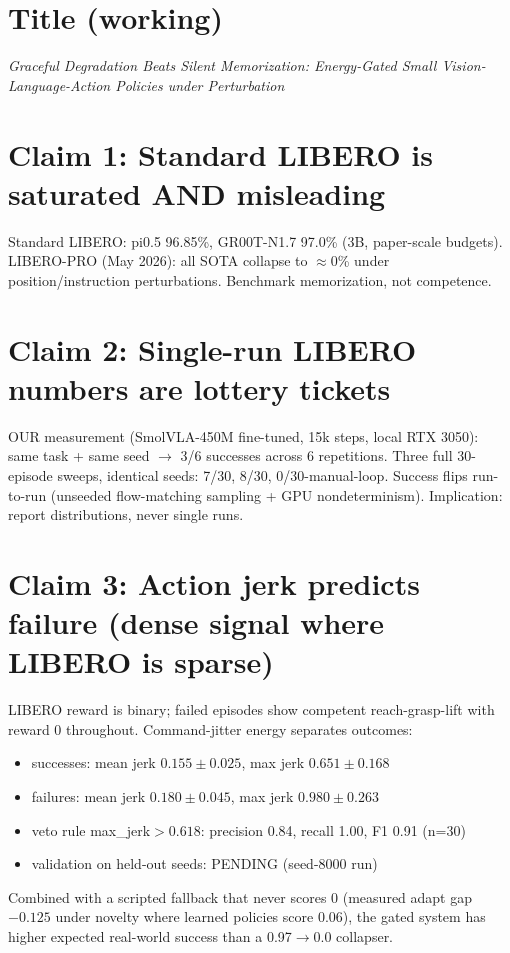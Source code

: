 \documentclass{article}
\begin{document}
\section*{Title (working)}
\emph{Graceful Degradation Beats Silent Memorization: Energy-Gated Small
Vision-Language-Action Policies under Perturbation}

\section*{Claim 1: Standard LIBERO is saturated AND misleading}
Standard LIBERO: pi0.5 96.85\%, GR00T-N1.7 97.0\% (3B, paper-scale budgets).
LIBERO-PRO (May 2026): all SOTA collapse to $\approx$0\% under
position/instruction perturbations. Benchmark memorization, not competence.

\section*{Claim 2: Single-run LIBERO numbers are lottery tickets}
OUR measurement (SmolVLA-450M fine-tuned, 15k steps, local RTX 3050):
same task + same seed $\to$ 3/6 successes across 6 repetitions.
Three full 30-episode sweeps, identical seeds: 7/30, 8/30, 0/30-manual-loop.
Success flips run-to-run (unseeded flow-matching sampling + GPU nondeterminism).
Implication: report distributions, never single runs.

\section*{Claim 3: Action jerk predicts failure (dense signal where LIBERO is sparse)}
LIBERO reward is binary; failed episodes show competent reach-grasp-lift
with reward 0 throughout. Command-jitter energy separates outcomes:
\begin{itemize}
\item successes: mean jerk $0.155\pm0.025$, max jerk $0.651\pm0.168$
\item failures: mean jerk $0.180\pm0.045$, max jerk $0.980\pm0.263$
\item veto rule max\_jerk$>0.618$: precision 0.84, recall 1.00, F1 0.91 (n=30)
\item validation on held-out seeds: PENDING (seed-8000 run)
\end{itemize}
Combined with a scripted fallback that never scores 0 (measured adapt gap
$-0.125$ under novelty where learned policies score 0.06), the gated system
has higher expected real-world success than a 0.97$\to$0.0 collapser.
\end{document}
